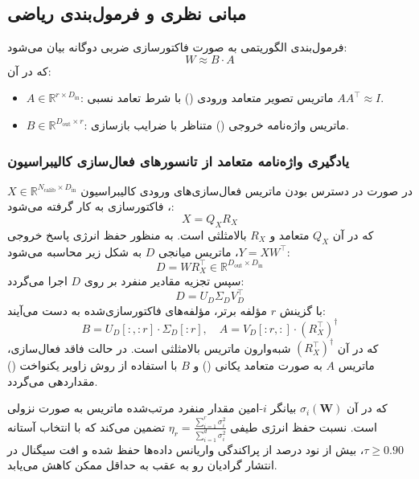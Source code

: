 \subsection{مبانی نظری و فرمول‌بندی ریاضی}
فرمول‌بندی الگوریتمی  به صورت فاکتورسازی ضربی دوگانه بیان می‌شود:
\begin{equation}
W \approx B \cdot A
\end{equation}
که در آن:
\begin{itemize}
    \item $A \in \mathbb{R}^{r \times D_{\text{in}}}$: ماتریس تصویر متعامد ورودی () با شرط تعامد نسبی $A A^\top \approx I$.
    \item $B \in \mathbb{R}^{D_{\text{out}} \times r}$: ماتریس واژه‌نامه خروجی () متناظر با ضرایب بازسازی.
\end{itemize}

\subsubsection*{یادگیری واژه‌نامه متعامد از تانسورهای فعال‌سازی کالیبراسیون}
در صورت در دسترس بودن ماتریس فعال‌سازی‌های ورودی کالیبراسیون $X \in \mathbb{R}^{N_{\text{calib}} \times D_{\text{in}}}$، فاکتورسازی  به کار گرفته می‌شود:
\begin{equation}
X = Q_X R_X
\end{equation}
که در آن $Q_X$ متعامد و $R_X$ بالا‌مثلثی است. به منظور حفظ انرژی پاسخ خروجی $Y = X W^\top$، ماتریس میانجی $D$ به شکل زیر محاسبه می‌شود:
\begin{equation}
D = W R_X^\top \in \mathbb{R}^{D_{\text{out}} \times D_{\text{in}}}
\end{equation}
سپس تجزیه مقادیر منفرد بر روی $D$ اجرا می‌گردد:
\begin{equation}
D = U_D \Sigma_D V_D^\top
\end{equation}
با گزینش $r$ مؤلفه برتر، مؤلفه‌های فاکتورسازی‌شده به دست می‌آیند:
\begin{equation}
B = U_D[:, :r] \cdot \Sigma_D[:r], \quad A = V_D[:r, :] \cdot (R_X^\top)^\dagger
\end{equation}
که در آن $(R_X^\top)^\dagger$ شبه‌وارون ماتریس بالامثلثی است. در حالت فاقد فعال‌سازی، ماتریس $A$ به صورت متعامد یکانی () و $B$ با استفاده از روش زاویر یکنواخت () مقداردهی می‌گردد.

که در آن $\sigma_i(\mathbf{W})$ بیانگر $i$-امین مقدار منفرد مرتب‌شده ماتریس به صورت نزولی است. نسبت حفظ انرژی طیفی $\eta_r = \frac{\sum_{i=1}^r \sigma_i^2}{\sum_{i=1}^{d} \sigma_i^2}$ تضمین می‌کند که با انتخاب آستانه $\tau \ge 0.90$، بیش از نود درصد از پراکندگی واریانس داده‌ها حفظ شده و افت سیگنال در انتشار گرادیان رو به عقب به حداقل ممکن کاهش می‌یابد.

